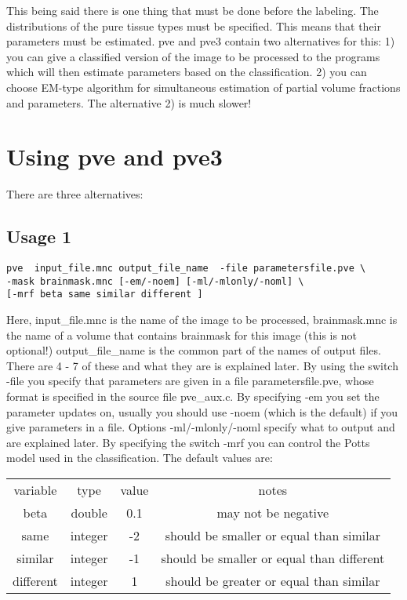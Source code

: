 \documentclass{article}
\begin{document}
This being said there is one thing that must be done before the
labeling. The distributions of the pure tissue types must be
specified. This means that their parameters must be estimated. pve and 
pve3 contain two alternatives for this: 1) you can give a classified
version of the image to be processed  to the programs which will
 then estimate parameters based on the classification. 2) you can
choose EM-type algorithm for simultaneous estimation of partial volume 
fractions
and parameters. The alternative 2) is much slower!

\section{Using pve and pve3}
There are three alternatives: \\

\subsection*{Usage 1}
\begin{verbatim}
pve  input_file.mnc output_file_name  -file parametersfile.pve \
-mask brainmask.mnc [-em/-noem] [-ml/-mlonly/-noml] \
[-mrf beta same similar different ]

\end{verbatim}
Here, input\_file.mnc is the name of the image to be processed,
brainmask.mnc is the name of  a
volume that contains brainmask for this image (this is not optional!)
output\_file\_name is the common part of the names of output
files. There are 4 - 7 of these and what they are is explained later.
By using the switch -file you specify that parameters are given in a
file parametersfile.pve, whose format is specified in the source file
pve\_aux.c. By specifying -em you set the parameter updates on, usually 
you should use -noem (which is the default) if you give parameters in
a file. Options -ml/-mlonly/-noml specify what to output and are
explained later. By specifying the switch -mrf you can control the
Potts model used in the classification. The default values are:

\begin{center}
\begin{tabular}{c|c|c|c}
variable & type & value & notes \\
beta & double & 0.1   &  may not be negative \\
same & integer & -2   & should be smaller or equal than similar \\
similar & integer & -1 & should be smaller or equal than different \\
different & integer & 1 & should be greater or equal than similar \\
\end{tabular}
\end{center}
\end{document}
